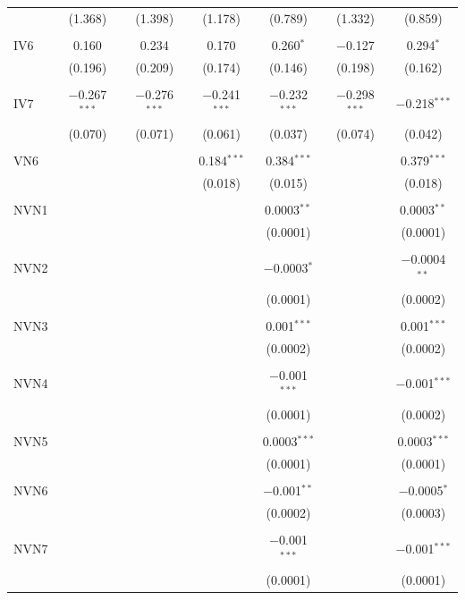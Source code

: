\begin{table}[!htbp]
\begin{tabular}{@{\extracolsep{5pt}}lcccccc}
  & (1.368) & (1.398) & (1.178) & (0.789) & (1.332) & (0.859) \\ 
  & & & & & & \\ 
 IV6 & 0.160 & 0.234 & 0.170 & 0.260$^{*}$ & $-$0.127 & 0.294$^{*}$ \\ 
  & (0.196) & (0.209) & (0.174) & (0.146) & (0.198) & (0.162) \\ 
  & & & & & & \\ 
 IV7 & $-$0.267$^{***}$ & $-$0.276$^{***}$ & $-$0.241$^{***}$ & $-$0.232$^{***}$ & $-$0.298$^{***}$ & $-$0.218$^{***}$ \\ 
  & (0.070) & (0.071) & (0.061) & (0.037) & (0.074) & (0.042) \\ 
  & & & & & & \\ 
 VN6 &  &  & 0.184$^{***}$ & 0.384$^{***}$ &  & 0.379$^{***}$ \\ 
  &  &  & (0.018) & (0.015) &  & (0.018) \\ 
  & & & & & & \\ 
 NVN1 &  &  &  & 0.0003$^{**}$ &  & 0.0003$^{**}$ \\ 
  &  &  &  & (0.0001) &  & (0.0001) \\ 
  & & & & & & \\ 
 NVN2 &  &  &  & $-$0.0003$^{*}$ &  & $-$0.0004$^{**}$ \\ 
  &  &  &  & (0.0001) &  & (0.0002) \\ 
  & & & & & & \\ 
 NVN3 &  &  &  & 0.001$^{***}$ &  & 0.001$^{***}$ \\ 
  &  &  &  & (0.0002) &  & (0.0002) \\ 
  & & & & & & \\ 
 NVN4 &  &  &  & $-$0.001$^{***}$ &  & $-$0.001$^{***}$ \\ 
  &  &  &  & (0.0001) &  & (0.0002) \\ 
  & & & & & & \\ 
 NVN5 &  &  &  & 0.0003$^{***}$ &  & 0.0003$^{***}$ \\ 
  &  &  &  & (0.0001) &  & (0.0001) \\ 
  & & & & & & \\ 
 NVN6 &  &  &  & $-$0.001$^{**}$ &  & $-$0.0005$^{*}$ \\ 
  &  &  &  & (0.0002) &  & (0.0003) \\ 
  & & & & & & \\ 
 NVN7 &  &  &  & $-$0.001$^{***}$ &  & $-$0.001$^{***}$ \\ 
  &  &  &  & (0.0001) &  & (0.0001) \\ 

\end{tabular}
\end{table}
